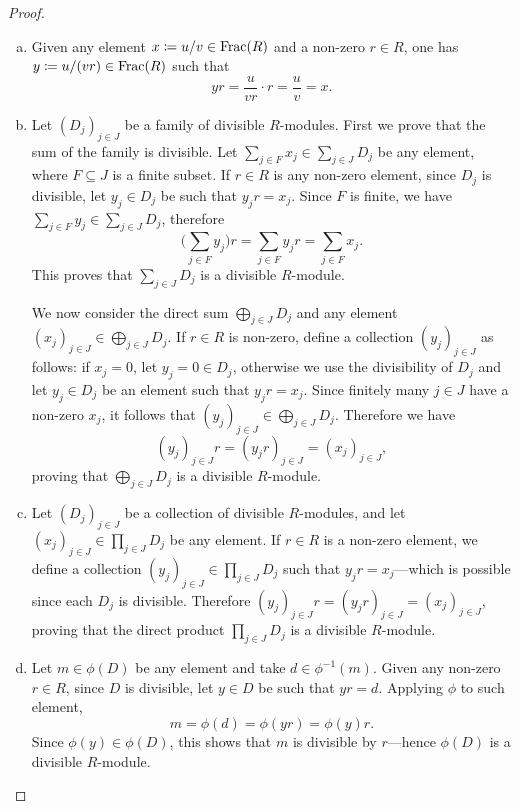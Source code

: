 \begin{proof}
\begin{enumerate}[(a)]\setlength\itemsep{0em}
\item Given any element \(x \coloneq u/v \in \operatorname{Frac}(R)\) and a non-zero
  \(r \in R\), one has \(y \coloneq u/(v r) \in \operatorname{Frac}(R)\) such that
  \[
  y r = \frac{u}{v r} \cdot r = \frac{u}{v} = x.
  \]

\item Let \((D_j)_{j \in J}\) be a family of divisible \(R\)-modules. First we
  prove that the sum of the family is divisible. Let
  \(\sum_{j \in F} x_j \in \sum_{j \in J} D_j\) be any element, where
  \(F \subseteq J\) is a finite subset. If \(r \in R\) is any non-zero element,
  since \(D_j\) is divisible, let \(y_j \in D_j\) be such that \(y_j r =
  x_j\). Since \(F\) is finite, we have \(\sum_{j \in F} y_j \in \sum_{j \in J}
  D_j\), therefore
  \[
  \Big( \sum_{j \in F} y_j \Big) r = \sum_{j \in F} y_j r = \sum_{j \in F} x_j.
  \]
  This proves that \(\sum_{j \in J} D_j\) is a divisible \(R\)-module.

  We now consider the direct sum \(\bigoplus_{j \in J} D_j\) and any element
  \((x_j)_{j \in J} \in \bigoplus_{j \in J} D_j\). If \(r \in R\) is non-zero,
  define a collection \((y_j)_{j \in J}\) as follows: if \(x_j = 0\), let
  \(y_j = 0 \in D_j\), otherwise we use the divisibility of \(D_j\) and let
  \(y_j \in D_j\) be an element such that \(y_j r = x_j\). Since finitely many
  \(j \in J\) have a non-zero \(x_j\), it follows that \((y_j)_{j \in J} \in
  \bigoplus_{j \in J} D_j\). Therefore we have
  \[
  (y_j)_{j \in J} r = (y_j r)_{j \in J} = (x_j)_{j \in J},
  \]
  proving that \(\bigoplus_{j \in J} D_j\) is a divisible \(R\)-module.

\item Let \((D_j)_{j \in J}\) be a collection of divisible \(R\)-modules, and
  let \((x_j)_{j \in J} \in \prod_{j \in J} D_j\) be any element. If \(r \in R\)
  is a non-zero element, we define a collection
  \((y_j)_{j \in J} \in \prod_{j \in J} D_j\) such that \(y_j r = x_j\)---which
  is possible since each \(D_j\) is divisible. Therefore
  \((y_j)_{j \in J} r = (y_j r)_{j \in J} = (x_j)_{j \in J}\), proving that the
  direct product \(\prod_{j \in J} D_j\) is a divisible \(R\)-module.

\item Let \(m \in \phi(D)\) be any element and take \(d \in
  \phi^{-1}(m)\). Given any non-zero \(r \in R\), since \(D\) is divisible, let
  \(y \in D\) be such that \(y r = d\). Applying \(\phi\) to such element,
  \[
  m = \phi(d) = \phi(y r) = \phi(y) r.
  \]
  Since \(\phi(y) \in \phi(D)\), this shows that \(m\) is divisible by
  \(r\)---hence \(\phi(D)\) is a divisible \(R\)-module.


\end{enumerate}
\end{proof}

